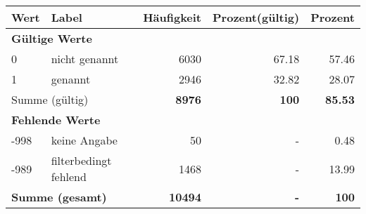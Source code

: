      \begin{longtable}{lXrrr}
     \toprule
     \textbf{Wert} & \textbf{Label} & \textbf{Häufigkeit} & \textbf{Prozent(gültig)} & \textbf{Prozent} \\
     \endhead
     \midrule
     \multicolumn{5}{l}{\textbf{Gültige Werte}}\\

     0 &
     \multicolumn{1}{X}{ nicht genannt   } &


       \num{6030} &
       \num[round-mode=places,round-precision=2]{67.18} &
         \num[round-mode=places,round-precision=2]{57.46} \\

     1 &
     \multicolumn{1}{X}{ genannt   } &


       \num{2946} &
       \num[round-mode=places,round-precision=2]{32.82} &
         \num[round-mode=places,round-precision=2]{28.07} \\
     \midrule
     \multicolumn{2}{l}{Summe (gültig)} &
       \textbf{\num{8976}} &
     \textbf{\num{100}} &
       \textbf{\num[round-mode=places,round-precision=2]{85.53}} \\
     \multicolumn{5}{l}{\textbf{Fehlende Werte}}\\
       -998 &
       keine Angabe &
         \num{50} &
        - &
         \num[round-mode=places,round-precision=2]{0.48} \\
       -989 &
       filterbedingt fehlend &
         \num{1468} &
        - &
         \num[round-mode=places,round-precision=2]{13.99} \\
     \midrule
     \multicolumn{2}{l}{\textbf{Summe (gesamt)}} &
          \textbf{\num{10494}} &
        \textbf{-} &
        \textbf{\num{100}} \\
     \bottomrule
     \end{longtable}
     
